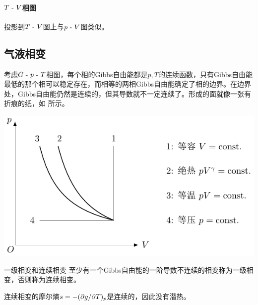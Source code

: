 \paragraph{$T~\text{-}~ V$相图}

投影到$T~\text{-}~ V$图上与$p~\text{-}~ V$图类似。

\subsection{气液相变}
\label{ssec:liquid-gas phase transition}

考虑$G~\text{-}~ p~\text{-}~ T$相图，每个相的Gibbs自由能都是$p,T$的连续函数，只有Gibbs自由能最低的那个相可以稳定存在，而相等的两相Gibbs自由能确定了相的边界。在边界处，Gibbs自由能仍然是连续的，但其导数就不一定连续了。形成的面就像一张有折痕的纸，如 所示。

\begin{center}
	\includegraphics[page=13]{figures/tikz/coordinates.pdf}
	\label{fig:phase G-p-T}
\end{center}

\begin{definition}
	{一级相变和连续相变}{}
	至少有一个Gibbs自由能的一阶导数不连续的相变称为一级相变，否则称为连续相变。
\end{definition}

\begin{corollary}
	连续相变的摩尔熵$s=-(\partial g/\partial T)_p$是连续的，因此没有潜热。
\end{corollary}

